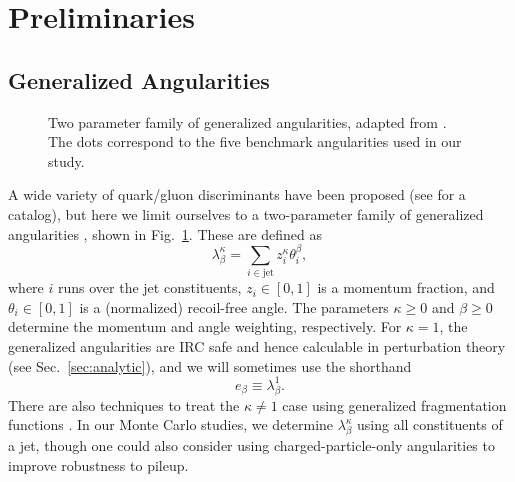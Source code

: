 \documentclass[11pt,letterpaper]{article}
\newcommand{\genang}[2]{{\lambda^{#1}_{#2}}}
\DeclareRobustCommand{\Sec}[1]{Sec.~\ref{#1}}
\DeclareRobustCommand{\Fig}[1]{Fig.~\ref{#1}}
\newcommand{\be}{\begin{equation}}
\newcommand{\ee}{\end{equation}}
\begin{document}
\section{Preliminaries}
\label{sec:prelim}

\subsection{Generalized Angularities}

\begin{figure}
\centering
{}
\caption{Two parameter family of generalized angularities, adapted from \cite{Larkoski:2014pca}.  The dots correspond to the five benchmark angularities used in our study.}
\label{fig:lambda_space}
\end{figure}

A wide variety of quark/gluon discriminants have been proposed (see \cite{} for a catalog), but here we limit ourselves to a two-parameter family of generalized angularities \cite{}, shown in \Fig{fig:lambda_space}.  These are defined as
\begin{equation}
\label{eq:genang}
\genang{\kappa}{\beta} = \sum_{i \in \text{jet}} z_i^\kappa \theta_i^\beta,
\end{equation}
where $i$ runs over the jet constituents, $z_i \in [0,1]$ is a momentum fraction, and $\theta_i \in [0,1]$ is a (normalized) recoil-free angle. The parameters $\kappa \ge 0$ and $\beta \ge 0$ determine the momentum and angle weighting, respectively.  For $\kappa = 1$, the generalized angularities are IRC safe and hence calculable in perturbation theory (see \Sec{sec:analytic}), and we will sometimes use the shorthand
\be
e_\beta \equiv \genang{1}{\beta}. 
\ee
There are also techniques to treat the $\kappa \not= 1$ case using generalized fragmentation functions \cite{Larkoski:2014pca}.  In our Monte Carlo studies, we determine $\genang{\kappa}{\beta}$ using all constituents of a jet, though one could also consider using charged-particle-only angularities to improve robustness to pileup.
\end{document}
